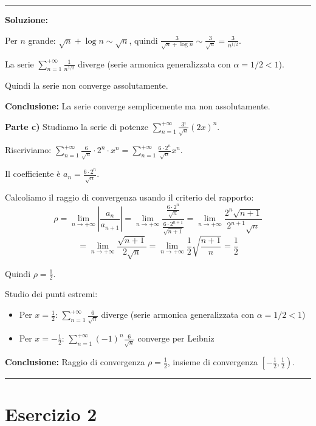 \documentclass[12pt, a4paper]{article}
\newenvironment{solution}
{\par\noindent\rule{\textwidth}{0.4pt}\par\textbf{Soluzione:}\medskip\par}
{\par\rule{\textwidth}{0.4pt}\par\bigskip}
\begin{document}
\begin{solution}
Per $n$ grande: $\sqrt{n} + \log n \sim \sqrt{n}$, quindi $\frac{3}{\sqrt{n} + \log n} \sim \frac{3}{\sqrt{n}} = \frac{3}{n^{1/2}}$.

La serie $\displaystyle\sum_{n=1}^{+\infty} \frac{1}{n^{1/2}}$ diverge (serie armonica generalizzata con $\alpha = 1/2 < 1$).

Quindi la serie non converge assolutamente.

\textbf{Conclusione:} La serie converge semplicemente ma non assolutamente.

\vspace{0.5cm}

\textbf{Parte c)} Studiamo la serie di potenze $\displaystyle\sum_{n=1}^{+\infty} \frac{3!}{\sqrt{n}}(2x)^{n}$.

Riscriviamo: $\displaystyle\sum_{n=1}^{+\infty} \frac{6}{\sqrt{n}} \cdot 2^n \cdot x^n = \displaystyle\sum_{n=1}^{+\infty} \frac{6 \cdot 2^n}{\sqrt{n}} x^n$.

Il coefficiente è $a_n = \frac{6 \cdot 2^n}{\sqrt{n}}$.

Calcoliamo il raggio di convergenza usando il criterio del rapporto:
\[
\rho = \lim_{n \to +\infty} \left|\frac{a_n}{a_{n+1}}\right| = \lim_{n \to +\infty} \frac{\frac{6 \cdot 2^n}{\sqrt{n}}}{\frac{6 \cdot 2^{n+1}}{\sqrt{n+1}}} = \lim_{n \to +\infty} \frac{2^n \sqrt{n+1}}{2^{n+1} \sqrt{n}}
\]
\[
= \lim_{n \to +\infty} \frac{\sqrt{n+1}}{2\sqrt{n}} = \lim_{n \to +\infty} \frac{1}{2}\sqrt{\frac{n+1}{n}} = \frac{1}{2}
\]

Quindi $\rho = \frac{1}{2}$.

Studio dei punti estremi:
\begin{itemize}
    \item Per $x = \frac{1}{2}$: $\displaystyle\sum_{n=1}^{+\infty} \frac{6}{\sqrt{n}}$ diverge (serie armonica generalizzata con $\alpha = 1/2 < 1$)
    \item Per $x = -\frac{1}{2}$: $\displaystyle\sum_{n=1}^{+\infty} (-1)^n \frac{6}{\sqrt{n}}$ converge per Leibniz
\end{itemize}

\textbf{Conclusione:} Raggio di convergenza $\rho = \frac{1}{2}$, insieme di convergenza $\left[-\frac{1}{2}, \frac{1}{2}\right)$.
\end{solution}

\newpage

\section*{Esercizio 2}
\end{document}
